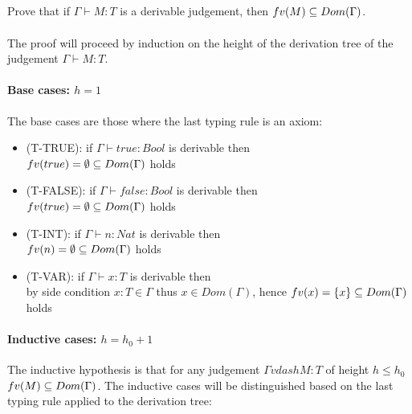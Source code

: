 \subsection{}

Prove that if $\Gamma \vdash M: T$ is a derivable judgement, then
$fv(M) \subseteq Dom(\Gamma)$.\\~\\
The proof will proceed by induction on the height of the derivation tree of the judgement
$\Gamma \vdash M: T$.

\paragraph*{Base cases: $h = 1$}

The base cases are those where the last typing rule is an axiom:

\begin{itemize}
	\item (T-TRUE): if $\Gamma \vdash true: Bool$ is derivable then\\
	      $fv(true) = \emptyset \subseteq Dom(\Gamma)$ holds
	\item (T-FALSE): if $\Gamma \vdash false: Bool$ is derivable then\\
	      $fv(true) = \emptyset \subseteq Dom(\Gamma)$ holds
	\item (T-INT): if $\Gamma \vdash n: Nat$ is derivable then\\
	      $fv(n) = \emptyset \subseteq Dom(\Gamma)$ holds
	\item (T-VAR): if $\Gamma \vdash x: T$ is derivable then\\
	      by side condition $x : T \in \Gamma$ thus $x \in Dom(\Gamma)$, hence
	      $fv(x) = \{x \} \subseteq Dom(\Gamma)$ holds
\end{itemize}

\paragraph*{Inductive cases: $h = h_0 + 1$}

The inductive hypothesis is that for any judgement $\Gamma vdash M: T$ of height $h \le h_0$
$fv(M) \subseteq Dom(\Gamma)$. The inductive cases will be distinguished based on the last
typing rule applied to the derivation tree:

